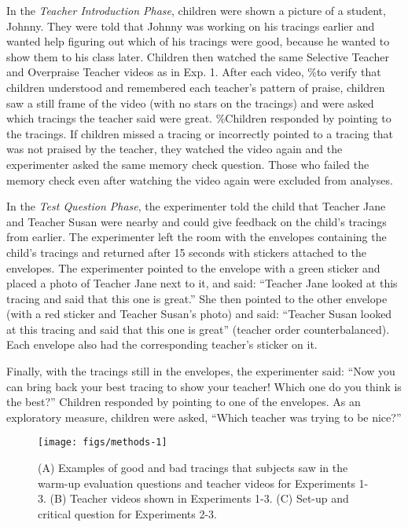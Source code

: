 \documentclass[10pt, letterpaper]{article}
\newenvironment{CodeChunk}{}{}
\begin{document}
In the \textit{Teacher Introduction Phase}, children were shown a
picture of a student, Johnny. They were told that Johnny was working on
his tracings earlier and wanted help figuring out which of his tracings
were good, because he wanted to show them to his class later. Children
then watched the same Selective Teacher and Overpraise Teacher videos as
in Exp. 1. After each video, \%to verify that children understood and
remembered each teacher's pattern of praise, children saw a still frame
of the video (with no stars on the tracings) and were asked which
tracings the teacher said were great. \%Children responded by pointing
to the tracings. If children missed a tracing or incorrectly pointed to
a tracing that was not praised by the teacher, they watched the video
again and the experimenter asked the same memory check question. Those
who failed the memory check even after watching the video again were
excluded from analyses.

In the \textit{Test Question Phase}, the experimenter told the child
that Teacher Jane and Teacher Susan were nearby and could give feedback
on the child's tracings from earlier. The experimenter left the room
with the envelopes containing the child's tracings and returned after 15
seconds with stickers attached to the envelopes. The experimenter
pointed to the envelope with a green sticker and placed a photo of
Teacher Jane next to it, and said: ``Teacher Jane looked at this tracing
and said that this one is great.'' She then pointed to the other
envelope (with a red sticker and Teacher Susan's photo) and said:
``Teacher Susan looked at this tracing and said that this one is great''
(teacher order counterbalanced). Each envelope also had the
corresponding teacher's sticker on it.

Finally, with the tracings still in the envelopes, the experimenter
said: ``Now you can bring back your best tracing to show your teacher!
Which one do you think is the best?'' Children responded by pointing to
one of the envelopes. As an exploratory measure, children were asked,
``Which teacher was trying to be nice?''

\begin{CodeChunk}
\begin{figure*}[h]

{\centering \texttt{[image: figs/methods-1]} 

}

\caption[(A) Examples of good and bad tracings that subjects saw in the warm-up evaluation questions and teacher videos for Experiments 1-3]{(A) Examples of good and bad tracings that subjects saw in the warm-up evaluation questions and teacher videos for Experiments 1-3. (B) Teacher videos shown in Experiments 1-3. (C) Set-up and critical question for Experiments 2-3.}\label{fig:methods}
\end{figure*}
\end{CodeChunk}
\end{document}
